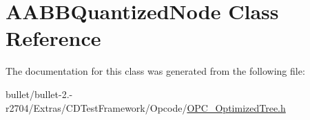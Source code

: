 \hypertarget{class_a_a_b_b_quantized_node}{\section{A\+A\+B\+B\+Quantized\+Node Class Reference}
\label{class_a_a_b_b_quantized_node}
}


The documentation for this class was generated from the following file\+:\begin{DoxyCompactItemize}
\item 
bullet/bullet-\/2.-\/r2704/\+Extras/\+C\+D\+Test\+Framework/\+Opcode/\hyperlink{_o_p_c___optimized_tree_8h}{O\+P\+C\+\_\+\+Optimized\+Tree.\+h}\end{DoxyCompactItemize}
